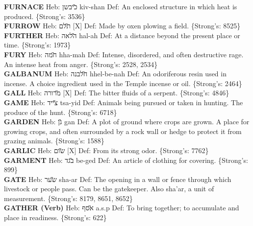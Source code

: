 {\textbf{FURNACE} Heb: {\large\H כיבשן} kiv-shan Def: An enclosed structure in which heat is produced. \{Strong's: 3536\}\hfill{}\\

\textbf{FURROW} Heb: {\large\H תלם} {[}X{]} Def: Made by oxen plowing a field. \{Strong's: 8525\}\hfill{}\\

\textbf{FURTHER} Heb: {\large\H הלאה} hal-ah Def: At a distance beyond the present place or time. \{Strong's: 1973\}\hfill{}\\

\textbf{FURY} Heb: {\large\H חמה} hha-mah Def: Intense, disordered, and often destructive rage. An intense heat from anger. \{Strong's: 2528, 2534\}\hfill{}\\

\textbf{GALBANUM} Heb: {\large\H חלבנה} hhel-be-nah Def: An odoriferous resin used in incense. A choice ingredient used in the Temple incense or oil. \{Strong's: 2464\}\hfill{}\\

\textbf{GALL} Heb: {\large\H מרורה} {[}X{]} Def: The bitter fluids of a serpent. \{Strong's: 4846\}\hfill{}\\

\textbf{GAME} Heb: {\large\H צייד} tsa-yid Def: Animals being pursued or taken in hunting. The produce of the hunt. \{Strong's: 6718\}\hfill{}\\

\textbf{GARDEN} Heb: {\large\H גן} gan Def: A plot of ground where crops are grown. A place for growing crops, and often surrounded by a rock wall or hedge to protect it from grazing animals. \{Strong's: 1588\}\hfill{}\\

\textbf{GARLIC} Heb: {\large\H שום} {[}X{]} Def: From its strong odor. \{Strong's: 7762\}\hfill{}\\

\textbf{GARMENT} Heb: {\large\H בגד} be-ged Def: An article of clothing for covering. \{Strong's: 899\}\hfill{}\\

\textbf{GATE} Heb: {\large\H שער} sha-ar Def: The opening in a wall or fence through which livestock or people pass. Can be the gatekeeper. Also sha'ar, a unit of measurement. \{Strong's: 8179, 8651, 8652\}\hfill{}\\

\textbf{GATHER (Verb)} Heb: {\large\H אסף} a.s.p Def: To bring together; to accumulate and place in readiness. \{Strong's: 622\}\hfill{}\\

}
